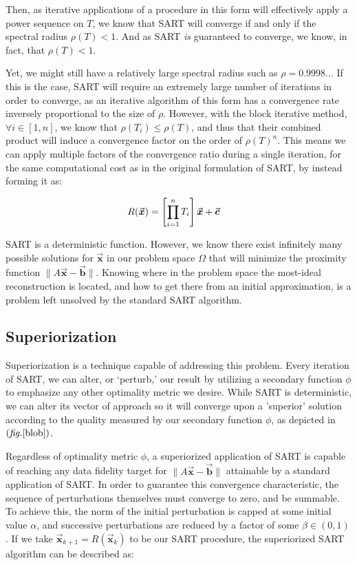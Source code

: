 \documentclass[sigconf,twocolumn,nonacm=true]{acmart}
\newcommand{\tighten}{\vspace*{-6pt plus -2pt minus -2pt}} %
\newcommand{\enc}[1]{\left( #1 \right)} %
\newcommand{\encl}[1]{\left[ #1 \right]} %
\newcommand{\vvec}[1]{\vec{\boldsymbol{#1}}} %
\newcommand{\norm}[1]{\lVert #1 \rVert} %
\newcommand{\ds}{\displaystyle} %
\newcommand{\lump}[1]{\mathclap{\substack{#1}}} %
\newcommand{\Prod}[2]{\ds\prod_{\lump{#1}}^{\lump{#2}}} %
\newcommand{\fig}[1]{$\enc{\textit{fig.}\ref{#1}}$}
\begin{document}
Then, as iterative applications of a procedure in this form will effectively apply a power sequence on $T$, we know that SART will converge if and only if the spectral radius $\rho(T)<1$\cite{young1981rate}. And as SART \textit{is} guaranteed to converge\cite{jiang2003convergence}, we know, in fact, that $\rho(T)<1$.

Yet, we might still have a relatively large spectral radius such as $\rho=0.9998\ldots$ If this is the case, SART will require an extremely large number of iterations in order to converge, as an iterative algorithm of this form has a convergence rate inversely proportional to the size of $\rho$. However, with the block iterative method, $\forall i \in [1,n]$, we know that $\rho(T_i)\leq\rho(T)$, and thus that their combined product will induce a convergence factor on the order of $\rho(T)^n$. This means we can apply multiple factors of the convergence ratio during a single iteration, for the same computational cost as in the original formulation of SART, by instead forming it as\cite{hudson1994accelerated}:

\tighten
\begin{align}
    R(\vvec{x}) &= \encl{\Prod{i=1}{n}T_i}\vvec{x} + \vvec{c}
\end{align}

SART is a deterministic function. However, we know there exist infinitely many possible solutions for $\vvec{x}$ in our problem space $\Omega$ that will minimize the proximity function $\norm{A\vvec{x}-\vvec{b}}$. Knowing where in the problem space the most-ideal reconstruction is located, and how to get there from an initial approximation, is a problem left unsolved by the standard SART algorithm.

\subsection{Superiorization}\tighten
Superiorization\cite{herman2012superiorization} is a technique capable of addressing this problem. Every iteration of SART, we can alter, or ‘perturb,’ our result by utilizing a secondary function $\phi$ to emphasize any other optimality metric we desire. While SART is deterministic, we can alter its vector of approach so it will converge upon a 'superior' solution according to the quality measured by our secondary function $\phi$, as depicted in \fig{blob}.
 
Regardless of optimality metric $\phi$, a superiorized application of SART is capable of reaching any data fidelity target for $\norm{A\vvec{x}-\vvec{b}}$ attainable by a standard application of SART. In order to guarantee this convergence characteristic, the sequence of perturbations themselves must converge to zero, and be summable. To achieve this, the norm of the initial perturbation is capped at some initial value $\alpha$, and successive perturbations are reduced by a factor of some $\beta\in(0,1)$. If we take $\vvec{x}_{k+1}=R(\vvec{x}_k)$ to be our SART procedure, the superiorized SART algorithm can be described as\cite{humphries2020comparison}:
\end{document}
